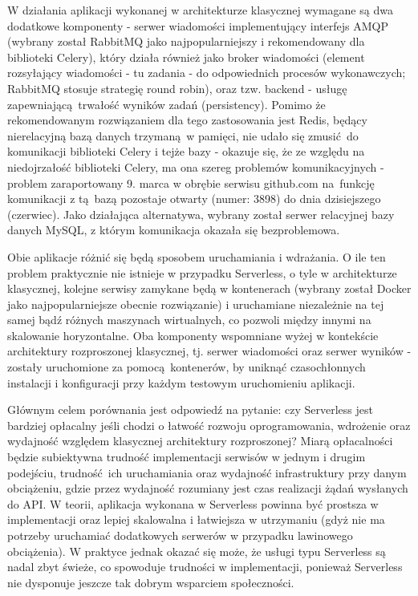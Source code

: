 \documentclass[oneside]{mgr}
\begin{document}
W działania aplikacji wykonanej w architekturze klasycznej wymagane są dwa dodatkowe komponenty - serwer wiadomości implementujący interfejs AMQP (wybrany został RabbitMQ jako najpopularniejszy i rekomendowany dla biblioteki Celery), który działa również jako broker wiadomości (element rozsyłający wiadomości - tu zadania - do odpowiednich procesów wykonawczych; RabbitMQ stosuje strategię round robin), oraz tzw. backend - usługę zapewniającą trwałość wyników zadań (persistency). Pomimo że rekomendowanym rozwiązaniem dla tego zastosowania jest Redis, będący nierelacyjną bazą danych trzymaną w pamięci, nie udało się zmusić do komunikacji biblioteki Celery i tejże bazy - okazuje się, że ze względu na niedojrzałość biblioteki Celery, ma ona szereg problemów komunikacyjnych - problem zaraportowany 9. marca w obrębie serwisu github.com na funkcję komunikacji z tą bazą pozostaje otwarty (numer: 3898) do dnia dzisiejszego (czerwiec). Jako działająca alternatywa, wybrany został serwer relacyjnej bazy danych MySQL, z którym komunikacja okazała się bezproblemowa. 

Obie aplikacje różnić się będą sposobem uruchamiania i wdrażania. O ile ten problem praktycznie nie istnieje w przypadku Serverless, o tyle w architekturze klasycznej, kolejne serwisy zamykane będą w kontenerach (wybrany został Docker jako najpopularniejsze obecnie rozwiązanie) i uruchamiane niezależnie na tej samej bądź różnych maszynach wirtualnych, co pozwoli między innymi na skalowanie horyzontalne. Oba komponenty wspomniane wyżej w kontekście architektury rozproszonej klasycznej, tj. serwer wiadomości oraz serwer wyników - zostały uruchomione za pomocą kontenerów, by uniknąć czasochłonnych instalacji i konfiguracji przy każdym testowym uruchomieniu aplikacji.

Głównym celem porównania jest odpowiedź na pytanie: czy Serverless jest bardziej opłacalny jeśli chodzi o łatwość rozwoju oprogramowania, wdrożenie oraz wydajność względem klasycznej architektury rozproszonej? Miarą opłacalności będzie subiektywna trudność implementacji serwisów w jednym i drugim podejściu, trudność ich uruchamiania  oraz wydajność infrastruktury przy danym obciążeniu, gdzie przez wydajność rozumiany jest czas realizacji żądań wysłanych do API. W teorii, aplikacja wykonana w Serverless powinna być prostsza w implementacji oraz lepiej skalowalna i łatwiejsza w utrzymaniu (gdyż nie ma potrzeby uruchamiać dodatkowych serwerów w przypadku lawinowego obciążenia). W praktyce jednak okazać się może, że usługi typu Serverless są nadal zbyt świeże, co spowoduje trudności w implementacji, ponieważ Serverless nie dysponuje jeszcze tak dobrym wsparciem społeczności.
\end{document}
